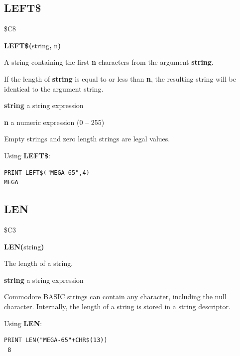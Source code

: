 \subsection{LEFT\$}
\begin{description}[leftmargin=2cm,style=nextline]
\item [Token:] \$C8
\item [Format:] {\bf LEFT\$(}string{\bf,} n{\bf)}
\item [Returns:] A string containing the first {\bf n} characters from the
               argument {\bf string}.

               If the length of {\bf string} is equal to or less than {\bf n},
               the resulting string will be identical to the argument string.

               {\bf string} a string expression

               {\bf n} a numeric expression (0 -- 255)

\item [Remarks:] Empty strings and zero length strings are legal values.

\item [Example:] Using {\bf LEFT\$}:
\begin{tcolorbox}[colback=black,coltext=white]
\verbatimfont{\codefont}
\begin{verbatim}
PRINT LEFT$("MEGA-65",4)
MEGA
\end{verbatim}
\end{tcolorbox}
\end{description}


\newpage
\subsection{LEN}
\begin{description}[leftmargin=2cm,style=nextline]
\item [Token:] \$C3
\item [Format:] {\bf LEN(}string{\bf)}
\item [Returns:] The length of a string.

               {\bf string} a string expression

\item [Remarks:] Commodore BASIC strings can contain any character, including
                 the null character. Internally, the length of a string is
                 stored in a string descriptor.

\item [Example:] Using {\bf LEN}:
\begin{tcolorbox}[colback=black,coltext=white]
\verbatimfont{\codefont}
\begin{verbatim}
PRINT LEN("MEGA-65"+CHR$(13))
 8
\end{verbatim}
\end{tcolorbox}
\end{description}

